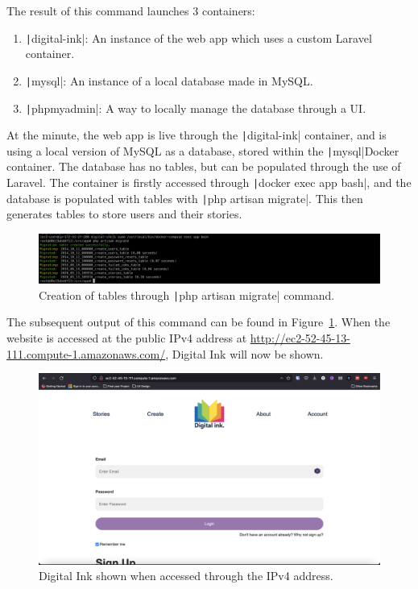 The result of this command launches 3 containers:

\begin{enumerate}
    \item \texttt|digital-ink|: An instance of the web app which uses a custom Laravel container.
    \item \texttt|mysql|: An instance of a local database made in MySQL\@.
    \item \texttt|phpmyadmin|: A way to locally manage the database through a UI\@.
\end{enumerate}

\clearpage
At the minute, the web app is live through the \texttt|digital-ink| container, and is using a local version
of MySQL as a database, stored within the \texttt|mysql|Docker container.
The database has no tables, but can be populated through the use of Laravel.
The container is firstly accessed through \texttt|docker exec app bash|, and the database is populated with
tables with \texttt|php artisan migrate|.
This then generates tables to store users and their stories.

\begin{figure}[!htbp]
    \centering
    \includegraphics[width=\textwidth]{resources/ec2/php-artisan-migrate}
    \caption{Creation of tables through \texttt|php artisan migrate| command.}
    \label{fig:php-artisan-migrate}
\end{figure}

The subsequent output of this command can be found in Figure~\ref{fig:php-artisan-migrate}.
When the website is accessed at the public IPv4 address at \href{http://ec2-54-145-212-82.compute-1.amazonaws.com/}{http://ec2-52-45-13-111.compute-1.amazonaws.com/},
Digital Ink will now be shown.

\begin{figure}[!htbp]
    \centering
    \includegraphics[width=\textwidth]{resources/ec2/digital-ink-ec2}
    \caption{Digital Ink shown when accessed through the IPv4 address. }
    \label{fig:digital-ink-ec2}
\end{figure}
